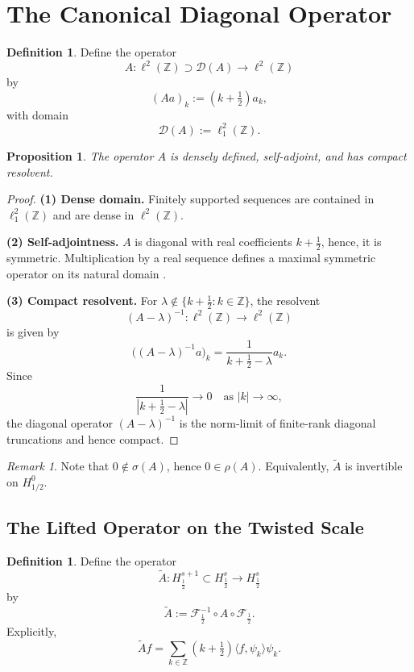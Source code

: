 \documentclass[11pt]{amsart}
\newtheorem{proposition}[theorem]{Proposition}
\theoremstyle{definition}
\newtheorem{definition}[theorem]{Definition}
\theoremstyle{remark}
\newtheorem{remark}[theorem]{Remark}
\begin{document}
\section{The Canonical Diagonal Operator}
\label{sec:operator}

\begin{definition}
Define the operator
\[
A : \ell^2(\mathbb{Z}) \supset \mathcal{D}(A) \to \ell^2(\mathbb{Z})
\]
by
\[
(Aa)_k := (k+\tfrac{1}{2}) a_k,
\]
with domain
\[
\mathcal{D}(A) := \ell^2_1(\mathbb{Z}).
\]
\end{definition}

\begin{proposition}
\label{prop:A-properties}
The operator $A$ is densely defined, self-adjoint, and has compact resolvent.
\end{proposition}

\begin{proof}
\textbf{(1) Dense domain.}
Finitely supported sequences are contained in $\ell^2_1(\mathbb{Z})$ and are dense in $\ell^2(\mathbb{Z})$.

\textbf{(2) Self-adjointness.}
$A$ is diagonal with real coefficients $k + \tfrac{1}{2}$, hence, it is symmetric. Multiplication by a real sequence defines a maximal symmetric operator on its natural domain \cite{reed-simon-v2}.

\textbf{(3) Compact resolvent.}
For $\lambda \notin \{k + \tfrac{1}{2} : k \in \mathbb{Z}\}$, the resolvent
\[
(A - \lambda)^{-1} : \ell^2(\mathbb{Z}) \to \ell^2(\mathbb{Z})
\]
is given by
\[
\bigl((A - \lambda)^{-1}a\bigr)_k = \frac{1}{k + \tfrac{1}{2} - \lambda} a_k.
\]
Since
\[
\frac{1}{|k + \tfrac{1}{2} - \lambda|} \to 0 \quad \text{as } |k| \to \infty,
\]
the diagonal operator $(A - \lambda)^{-1}$ is the norm-limit of finite-rank diagonal truncations and hence compact.
\end{proof}

\begin{remark}
Note that $0\notin\sigma(A)$, hence $0\in\rho(A)$. Equivalently, $\widetilde A$ is invertible on $H^0_{1/2}$.
\end{remark}

\subsection{The Lifted Operator on the Twisted Scale}

\begin{definition}
Define the operator
\[
\widetilde{A} : H^{s+1}_{\frac{1}{2}} \subset H^s_{\frac{1}{2}} \longrightarrow H^s_{\frac{1}{2}}
\]
by
\[
\widetilde{A} := \mathcal{F}_{\frac{1}{2}}^{-1} \circ A \circ \mathcal{F}_{\frac{1}{2}}.
\]
Explicitly,
\[
\widetilde{A} f = \sum_{k \in \mathbb{Z}} (k+\tfrac{1}{2}) \langle f, \psi_k \rangle \psi_k.
\]
\end{definition}
\end{document}

